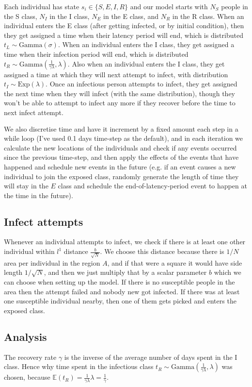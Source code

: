 \documentclass[11pt]{article}
\begin{document}
Each individual has state $s_i\in \{S,E,I,R\}$ and our model starts with $N_S$ people in the S class, $N_I$ in the I class, $N_E$ in the E class, and $N_R$ in the R class. When an individual enters the E class (after getting infected, or by initial condition), then they get assigned a time when their latency period will end, which is distributed $t_L \sim \text{Gamma}(\sigma)$. When an individual enters the I class, they get assigned a time when their infection period will end, which is distributed $t_R \sim \text{Gamma}(\frac{1}{\gamma\lambda}, \lambda)$. Also when an individual enters the I class, they get assigned a time at which they will next attempt to infect, with distribution $t_I\sim \text{Exp}(\lambda)$. Once an infectious person attempts to infect, they get assigned the next time when they will infect (with the same distribution), though they won't be able to attempt to infect any more if they recover before the time to next infect attempt.

We also discretise time and have it increment by a fixed amount each step in a while loop (I've used 0.1 days time-step as the default), and in each iteration we calculate the new locations of the individuals and check if any events occurred since the previous time-step, and then apply the effects of the events that have happened and schedule new events in the future (e.g. if an event causes a new individual to join the exposed class, randomly generate the length of time they will stay in the $E$ class and schedule the end-of-latency-period event to happen at the time in the future).
\subsection{Infect attempts}
Whenever an individual attempts to infect, we check if there is at least one other individual within $l^1$ distance $\frac{b}{\sqrt{N}}$. We choose this distance because there is $1/N$ area per individual in the region $A$, and if that were a square it would have side length $1/\sqrt{N}$, and then we just multiply that by a scalar parameter $b$ which we can choose when setting up the model. If there is no susceptible people in the area then the attempt failed and nobody new got infected. If there was at least one susceptible individual nearby, then one of them gets picked and enters the exposed class.

\subsection{Analysis}
The recovery rate $\gamma$ is the inverse of the average number of days spent in the I class. Hence why time spent in the infectious class $t_R \sim \text{Gamma}(\frac{1}{\gamma\lambda}, \lambda)$ was chosen, because $\mathbb{E}(t_R)=\frac{1}{\gamma\lambda} \lambda=\frac{1}{\gamma}$.
\end{document}
